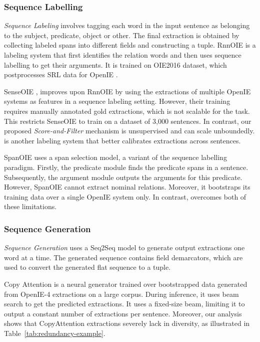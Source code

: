        \subsubsection{Sequence Labelling}
            \emph{Sequence Labeling} involves tagging each word in the input sentence as belonging to the subject, predicate, object or other. The final extraction is obtained by collecting labeled spans into different fields and constructing a tuple. RnnOIE \citep{stanovsky&al18} is a labeling system that first identifies the relation words and then uses sequence labelling to get their arguments. It is trained on OIE2016 dataset, which postprocesses SRL data for OpenIE \citep{Stanovsky2016EMNLP}.

            SenseOIE \citep{roy&al19}, improves upon RnnOIE by using the extractions of multiple OpenIE systems as features in a sequence labeling setting. However, their training requires manually annotated gold extractions, which is not scalable for the task. This restricts SenseOIE to train on a dataset of 3,000 sentences. In contrast, our proposed \textit{Score-and-Filter} mechanism is unsupervised and can scale unboundedly. \citet{jiang12019improving} is another labeling system that better calibrates extractions across sentences.
    
            SpanOIE \citep{zhan&al19} uses a span selection model, a variant of the sequence labelling paradigm. Firstly, the predicate module finds the predicate spans in a sentence. Subsequently, the argument module outputs the arguments for this predicate. However, SpanOIE cannot extract nominal relations. Moreover, it bootstraps its training data over a single OpenIE system only. In contrast, \shortname{} overcomes both of these limitations. 

        \subsubsection{Sequence Generation}
            \emph{Sequence Generation} uses a Seq2Seq model to generate output extractions one word at a time. The generated sequence contains field demarcators, which are used to convert the generated flat sequence to a tuple.
            
            Copy Attention \citep{cui&al18} is a neural generator trained over bootstrapped data generated from OpenIE-4 extractions on a large corpus. During inference, it uses beam search to get the predicted extractions. It uses a fixed-size beam, limiting it to output a constant number of extractions per sentence. Moreover, our analysis shows that CopyAttention extractions severely lack in diversity, as illustrated in Table~\ref{tab:redundancy-example}.
            
